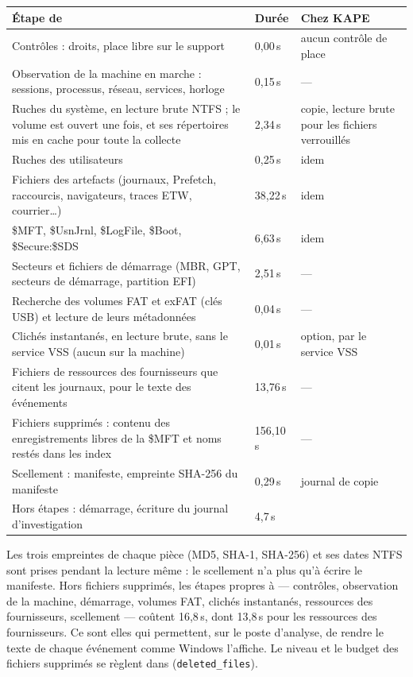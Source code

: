 \documentclass[11pt,a4paper,oneside]{report}
\begin{document}
\begin{longtable}{@{}L{8.4cm}L{2.0cm}L{4.6cm}@{}}
\toprule
\textbf{Étape de \wac{}} & \textbf{Durée} & \textbf{Chez KAPE} \\
\midrule\endhead
Contrôles : droits, place libre sur le support & 0,00\,s & aucun contrôle de place \\
Observation de la machine en marche : sessions, processus, réseau, services, horloge & 0,15\,s & --- \\
Ruches du système, en lecture brute NTFS ; le volume est ouvert une fois, et
  ses répertoires mis en cache pour toute la collecte & 2,34\,s & copie, lecture brute pour les fichiers verrouillés \\
Ruches des utilisateurs & 0,25\,s & idem \\
Fichiers des artefacts (journaux, Prefetch, raccourcis, navigateurs, traces
  ETW, courrier…) & 38,22\,s & idem \\
\$MFT, \$UsnJrnl, \$LogFile, \$Boot, \$Secure:\$SDS & 6,63\,s & idem \\
Secteurs et fichiers de démarrage (MBR, GPT, secteurs de démarrage, partition EFI) & 2,51\,s & --- \\
Recherche des volumes FAT et exFAT (clés USB) et lecture de leurs métadonnées & 0,04\,s & --- \\
Clichés instantanés, en lecture brute, sans le service VSS (aucun sur la machine) & 0,01\,s & option, par le service VSS \\
Fichiers de ressources des fournisseurs que citent les journaux, pour le
  texte des événements & 13,76\,s & --- \\
Fichiers supprimés : contenu des enregistrements libres de la \$MFT et noms
  restés dans les index & 156,10\,s & --- \\
Scellement : manifeste, empreinte SHA-256 du manifeste & 0,29\,s & journal de copie \\
Hors étapes : démarrage, écriture du journal d'investigation & 4,7\,s & \\
\bottomrule
\end{longtable}

Les trois empreintes de chaque pièce (MD5, SHA-1, SHA-256) et ses dates NTFS
sont prises pendant la lecture même : le scellement n'a plus qu'à écrire le
manifeste. Hors fichiers supprimés, les étapes propres à \wac{} --- contrôles,
observation de la machine, démarrage, volumes FAT, clichés instantanés,
ressources des fournisseurs, scellement --- coûtent 16,8\,s, dont 13,8\,s pour
les ressources des fournisseurs. Ce sont elles qui permettent, sur le poste
d'analyse, de rendre le texte de chaque événement comme Windows l'affiche. Le
niveau et le budget des fichiers supprimés se règlent dans 
(\texttt{deleted\_files}).
\end{document}
